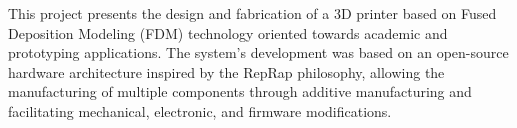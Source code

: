 This project presents the design and fabrication of a 3D printer based on 
Fused Deposition Modeling (FDM) technology oriented towards academic and 
prototyping applications. The system's development was based on an open-source 
hardware architecture inspired by the RepRap philosophy, allowing the 
manufacturing of multiple components through additive manufacturing and 
facilitating mechanical, electronic, and firmware modifications.

